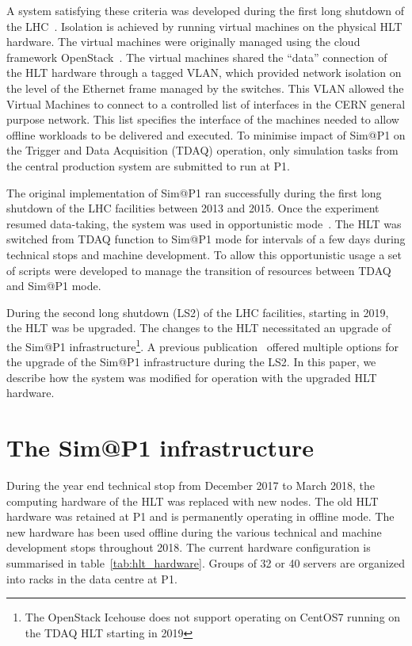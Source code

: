 \documentclass{webofc}
\begin{document}
A system satisfying these criteria was developed during the first long shutdown
of the LHC~\cite{Ballestrero:2015ypa}. Isolation is achieved by running virtual
machines on the physical HLT hardware. The virtual machines were originally
managed using
the cloud framework OpenStack~\cite{openstack}. The virtual machines shared the
``data'' connection of the HLT hardware through a tagged VLAN, which provided
network
isolation on the level of the Ethernet frame managed by the switches. This VLAN
allowed the Virtual Machines to connect to a controlled list of interfaces in
the
CERN general purpose network. This list specifies the interface of the machines
needed to allow offline workloads to be delivered and executed. To minimise
impact of Sim@P1 on the Trigger and Data Acquisition (TDAQ) operation, only
simulation tasks from the central production system are submitted to run at P1.

The original implementation of Sim@P1 ran successfully during the first long
shutdown of the LHC facilities between 2013 and 2015. Once the experiment
resumed data-taking, the system was used in opportunistic
mode~\cite{Ballestrero:2017psv}. The HLT was switched from TDAQ function to
Sim@P1 mode for intervals of a few days during technical stops and machine
development. To allow this opportunistic usage a set of scripts were developed
to manage the transition of resources between TDAQ and Sim@P1 mode.

During the second long shutdown (LS2) of the LHC facilities, starting in 2019,
the HLT
was be upgraded. The changes to the HLT necessitated an upgrade of the Sim@P1
infrastructure\footnote{The OpenStack Icehouse does not support operating on
CentOS7 running on the TDAQ HLT starting in 2019}. A previous
publication~\cite{Berghaus:2019wuj} offered multiple options for the upgrade of
the Sim@P1 infrastructure during the LS2. In this paper, we describe how the
system was modified for operation with the upgraded HLT hardware.

\section{The Sim@P1 infrastructure}
\label{sec:infra}
During the year end technical stop from December 2017 to March 2018, the
computing hardware of the HLT was replaced with new nodes. The old HLT hardware
was retained at P1 and is permanently operating in offline mode. The new
hardware has
been used offline during the various technical and machine development
stops throughout 2018. The current hardware configuration is summarised in
table~\ref{tab:hlt_hardware}. Groups of 32 or 40 servers are organized into
racks in the data centre at P1.
\end{document}

